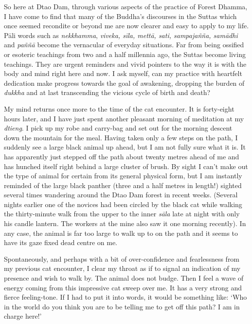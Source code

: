 So here at Dtao Dam, through various aspects of the practice of Forest
Dhamma, I have come to find that many of the Buddha's discourses in the
Suttas which once seemed recondite or beyond me are now clearer and easy
to apply to my life. Pāli words such as \emph{nekkhamma}, \emph{viveka, 
sīla, mettā, sati, sampajañña, samādhi} and \emph{paññā} become the
vernacular of everyday situations. Far from being ossified or esoteric
teachings from two and a half millennia ago, the Suttas become living
teachings. They are urgent reminders and vivid pointers to the way it is
with the body and mind right here and now. I ask myself, can my practice
with heartfelt dedication make progress towards the goal of awakening, 
dropping the burden of \emph{dukkha} and at last transcending the
vicious cycle of birth and death? 

My mind returns once more to the time of the cat encounter. It is
forty-eight hours later, and I have just spent another pleasant morning
of meditation at my \emph{dtieng}. I pick up my robe and carry-bag and
set out for the morning descent down the mountain for the meal. Having
taken only a few steps on the path, I suddenly see a large black animal
up ahead, but I am not fully sure what it is. It has apparently just
stepped off the path about twenty metres ahead of me and has hunched
itself right behind a large cluster of brush. By sight I can't make out
the type of animal for certain from its general physical form, but I am
instantly reminded of the large black panther (three and a half metres
in length!) sighted several times wandering around the Dtao Dam forest
in recent weeks. (Several nights earlier one of the novices had been
circled by the black cat while walking the thirty-minute walk from the
upper to the inner \emph{sāla} late at night with only his candle
lantern. The workers at the mine also saw it one morning recently). In
any case, the animal is far too large to walk up to on the path and it
seems to have its gaze fixed dead centre on me. 

Spontaneously, and perhaps with a bit of over-confidence and
fearlessness from my previous cat encounter, I clear my throat as if to
signal an indication of my presence and wish to walk by. The animal does
not budge. Then I feel a wave of energy coming from this impressive cat
sweep over me. It has a very strong and fierce feeling-tone. If I had to
put it into words, it would be something like: `Who in the world do you
think you are to be telling me to get off this path? I am in charge
here!'

